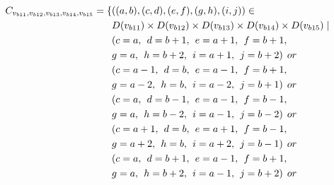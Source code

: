 \begin{align*}
\Cons{b11}{b12}{b13}{b14}{b15}=\{&((a,b),(c,d),(e,f),(g,h),(i,j))\in \\
&\Domain {b11} \times \Domain{b12}\times \Domain{b13}\times \Domain{b14}\times \Domain{b15} \mid\\
&(c = a,\hspace{1ex}d = b+1,\hspace{1ex}e=a+1,\hspace{1ex}f=b+1,
\\&g=a,\hspace{1ex}h=b+2,\hspace{1ex}i=a+1,\hspace{1ex}j=b+2)\hspace{1ex} or \\
&(c = a-1 ,\hspace{1ex}d = b,\hspace{1ex}e=a-1,\hspace{1ex}f=b+1,
\\&g=a-2,\hspace{1ex}h=b,\hspace{1ex}i=a-2,\hspace{1ex}j=b+1)\hspace{1ex} or \\
&(c = a ,\hspace{1ex}d = b-1,\hspace{1ex}e=a-1,\hspace{1ex}f=b-1,
\\&g=a,\hspace{1ex}h=b-2,\hspace{1ex}i=a-1,\hspace{1ex}j=b-2)\hspace{1ex} or \\
&(c = a+1 ,\hspace{1ex}d = b,\hspace{1ex}e=a+1,\hspace{1ex}f=b-1,
\\&g=a+2,\hspace{1ex}h=b,\hspace{1ex}i=a+2,\hspace{1ex}j=b-1)\hspace{1ex} or \\
&(c = a,\hspace{1ex}d = b+1,\hspace{1ex}e=a-1,\hspace{1ex}f=b+1,
\\&g=a,\hspace{1ex}h=b+2,\hspace{1ex}i=a-1,\hspace{1ex}j=b+2)\hspace{1ex} or \\

\end{align*}
